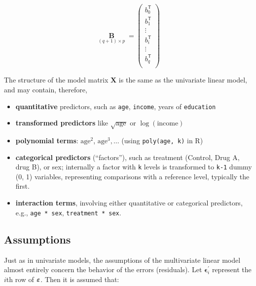 \documentclass[
  letterpaper,
  10pt,
  krantz2]{krantz}
\providecommand{\tightlist}{%
  \setlength{\itemsep}{0pt}\setlength{\parskip}{0pt}}\usepackage{longtable,booktabs,array}
\begin{document}
\[
\mathord{\mathop{\mathbf{B}}\limits_{(q+1) \times p}} =
\begin{pmatrix} 
  b_{0}^\mathsf{T} \\ 
  b_{1}^\mathsf{T}  \\ 
  \vdots \\
  b_{i}^\mathsf{T}  \\
  \vdots \\
  b_{q}^\mathsf{T}  \\ 
\end{pmatrix}
\]

The structure of the model matrix \(\mathbf{X}\) is the same as the
univariate linear model, and may contain, therefore,

\begin{itemize}
\tightlist
\item
  \textbf{quantitative} predictors, such as \texttt{age},
  \texttt{income}, years of \texttt{education}
\item
  \textbf{transformed predictors} like \(\sqrt{\text{age}}\) or
  \(\log{(\text{income})}\)
\item
  \textbf{polynomial terms}: \(\text{age}^2\), \(\text{age}^3, \dots\)
  (using \texttt{poly(age,\ k)} in R)
\item
  \textbf{categorical predictors} (``factors''), such as treatment
  (Control, Drug A, drug B), or sex; internally a factor with \texttt{k}
  levels is transformed to \texttt{k-1} dummy (0, 1) variables,
  representing comparisons with a reference level, typically the first.
\item
  \textbf{interaction terms}, involving either quantitative or
  categorical predictors, e.g., \texttt{age\ *\ sex},
  \texttt{treatment\ *\ sex}.
\end{itemize}

\subsection{Assumptions}\label{assumptions}

Just as in univariate models, the assumptions of the multivariate linear
model almost entirely concern the behavior of the errors (residuals).
Let \(\mathbf{\epsilon}_{i}^{\prime}\) represent the \(i\)th row of
\(\boldsymbol{\Large\varepsilon}\). Then it is assumed that:
\end{document}

